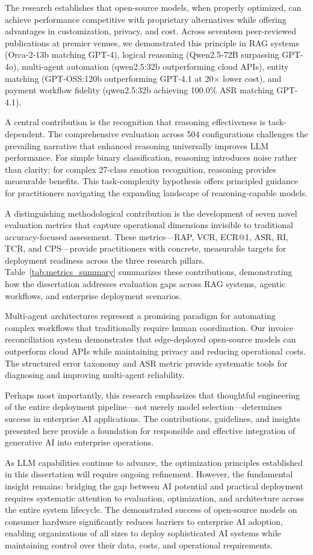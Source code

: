 The research establishes that open-source models, when properly optimized, can achieve performance competitive with proprietary alternatives while offering advantages in customization, privacy, and cost. Across seventeen peer-reviewed publications at premier venues, we demonstrated this principle in RAG systems (Orca-2-13b matching GPT-4), logical reasoning (Qwen2.5-72B surpassing GPT-4o), multi-agent automation (qwen2.5:32b outperforming cloud APIs), entity matching (GPT-OSS:120b outperforming GPT-4.1 at 20$\times$ lower cost), and payment workflow fidelity (qwen2.5:32b achieving 100.0\% ASR matching GPT-4.1).

A central contribution is the recognition that reasoning effectiveness is task-dependent. The comprehensive evaluation across 504 configurations challenges the prevailing narrative that enhanced reasoning universally improves LLM performance. For simple binary classification, reasoning introduces noise rather than clarity; for complex 27-class emotion recognition, reasoning provides measurable benefits. This task-complexity hypothesis offers principled guidance for practitioners navigating the expanding landscape of reasoning-capable models.

A distinguishing methodological contribution is the development of seven novel evaluation metrics that capture operational dimensions invisible to traditional accuracy-focused assessment. These metrics---RAP, VCR, ECR@1, ASR, RI, TCR, and CPS---provide practitioners with concrete, measurable targets for deployment readiness across the three research pillars. Table~\ref{tab:metrics_summary} summarizes these contributions, demonstrating how the dissertation addresses evaluation gaps across RAG systems, agentic workflows, and enterprise deployment scenarios.

Multi-agent architectures represent a promising paradigm for automating complex workflows that traditionally require human coordination. Our invoice reconciliation system demonstrates that edge-deployed open-source models can outperform cloud APIs while maintaining privacy and reducing operational costs. The structured error taxonomy and ASR metric provide systematic tools for diagnosing and improving multi-agent reliability.

Perhaps most importantly, this research emphasizes that thoughtful engineering of the entire deployment pipeline---not merely model selection---determines success in enterprise AI applications. The contributions, guidelines, and insights presented here provide a foundation for responsible and effective integration of generative AI into enterprise operations.

As LLM capabilities continue to advance, the optimization principles established in this dissertation will require ongoing refinement. However, the fundamental insight remains: bridging the gap between AI potential and practical deployment requires systematic attention to evaluation, optimization, and architecture across the entire system lifecycle. The demonstrated success of open-source models on consumer hardware significantly reduces barriers to enterprise AI adoption, enabling organizations of all sizes to deploy sophisticated AI systems while maintaining control over their data, costs, and operational requirements.